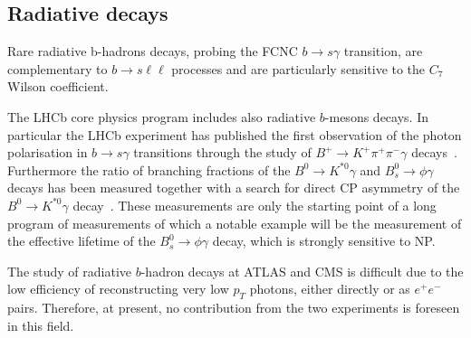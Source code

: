 \subsection{Radiative decays}

Rare radiative b-hadrons decays, probing the FCNC $b\to s \gamma$ transition, are complementary 
to $b\to s \ell \ell $ processes and are particularly sensitive to the $C_7$ Wilson coefficient. 

The LHCb core physics program includes also radiative $b$-mesons decays. 
In particular the LHCb experiment has published the first observation of the photon polarisation in $b\to s \gamma$
transitions through the study of $B^+ \to K^+ \pi^+ \pi^-\gamma$ decays~\cite{Aaij:2014wgo}. 
Furthermore  the ratio of branching fractions of the $B^0\to K^{\ast 0} \gamma$ and $B^0_s\to \phi \gamma$ decays has been measured
together with a search for direct CP asymmetry of the $B^0\to K^{\ast 0}\gamma$ decay~\cite{Aaij:2012ita}.
These measurements are only the starting point of a long program of measurements of which a notable example will be the measurement of the effective lifetime of the $B^0_s \to \phi\gamma$ decay, which is strongly sensitive to NP. 

The study of radiative $b$-hadron decays at ATLAS and CMS is difficult due to the low efficiency of reconstructing very low $p_T$ photons, either directly or as $e^+e^-$ pairs.
Therefore, at present, no contribution from the two experiments is foreseen in this field. 



